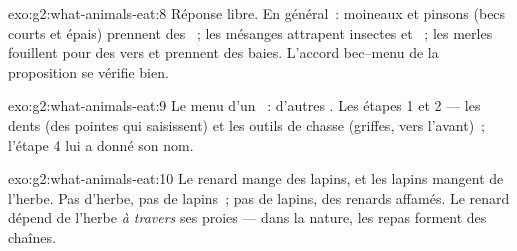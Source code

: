 \begin{solution}{exo:g2:what-animals-eat:8}
Réponse libre. En général~: moineaux et pinsons (becs courts et
épais) prennent des ~; les mésanges attrapent insectes et
~; les merles fouillent pour des vers et prennent des baies.
L'accord bec--menu de la proposition se vérifie bien.
\end{solution}

\begin{solution}{exo:g2:what-animals-eat:9}
Le menu d'un ~: d'autres . Les étapes 1 et 2 --- les
dents (des pointes qui saisissent) et les outils de chasse (griffes,
 vers l'avant)~; l'étape 4 lui a donné son nom.
\end{solution}

\begin{solution}{exo:g2:what-animals-eat:10}
Le renard mange des lapins, et les lapins mangent de l'herbe. Pas
d'herbe, pas de lapins~; pas de lapins, des renards affamés. Le
renard dépend de l'herbe \emph{à travers} ses proies --- dans la
nature, les repas forment des chaînes.
\end{solution}

